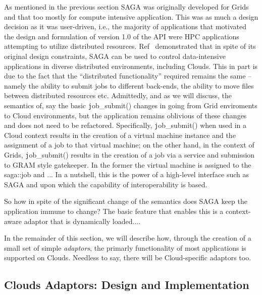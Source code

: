 \documentclass[conference,final]{IEEEtran}
\begin{document}
As mentioned in the previous section SAGA was originally developed for
Grids and that too mostly for compute intensive application. This was
as much a design decision as it was user-driven, i.e., the majority of
applications that motivated the design and formulation of version 1.0
of the API were HPC applications attempting to utilize distributed
resources.  Ref~\cite{saga_ccgrid09} demonstrated that in spite of its
original design constraints, SAGA can be used to control
data-intensive applications in diverse distributed environments,
including Clouds.  This in part is due to the fact that the
``distributed functionality'' required remains the same -- namely the
ability to submit jobs to different back-ends, the ability to move
files between distributed resources etc. Admittedly, and as we will
discuss, the semantics of, say the basic {\texttt job\_submit()}
changes in going from Grid enviroments to Cloud environments, but the
application remains oblivious of these changes and does not need to be
refactored. Specifically, {\texttt job\_submit()} when used in a Cloud
context results in the creation of a virtual machine instance and the
assignment of a job to that virtual machine; on the other hand, in the
context of Grids, {\texttt job\_submit()} results in the creation of a
job via a service and submission to GRAM style gatekeeper. In the
former the virtual machine is assigned to the saga::job and ...  In a
nutshell, this is the power of a high-level interface such as SAGA and
upon which the capability of interoperability is based.


So how in spite of the significant change of the semantics does SAGA
keep the application immune to change? The basic feature that enables
this is a context-aware adaptor that is dynamically loaded....


In the remainder of this section, we will describe how, through 
the creation of a small set of simple {\it adaptors}, the primarly
functionality of most applications is supported on Clouds. Needless
to say, there will be Cloud-specific adaptors too.

\subsection{Clouds Adaptors: Design and Implementation}
\end{document}
